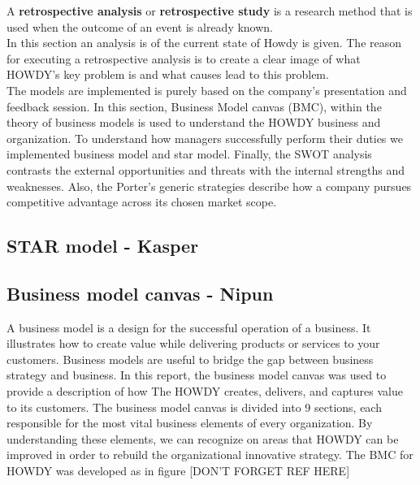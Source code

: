 

A \textbf{retrospective analysis} or \textbf{retrospective study} is a research method that is used when the outcome of an event is already known.\\
\noindent In this section an analysis is of the current state of Howdy is given. The reason for executing a retrospective analysis is to create a clear image of what HOWDY’s key problem is and what causes lead to this problem.\\
\noindent The models are implemented is purely based on the company’s presentation and feedback session. In this section, Business Model canvas (BMC), within the theory of business models is used to understand the HOWDY business and organization. To understand how managers successfully perform their duties we implemented business model and star model. Finally, the SWOT analysis contrasts the external opportunities and threats with the internal strengths and weaknesses. Also, the Porter's generic strategies describe how a company pursues competitive advantage across its chosen market scope.



\subsection{STAR model - Kasper}

\subsection{Business model canvas - Nipun}
A business model is a design for the successful operation of a business. It illustrates how to create value while delivering products or services to your customers. Business models are useful to bridge the gap between business strategy and business. In this report, the business model canvas was used to provide a description of how The HOWDY creates, delivers, and captures value to its customers. The business model canvas is divided into 9 sections, each responsible for the most vital business elements of every organization. By understanding these elements, we can recognize on areas that HOWDY can be improved in order to rebuild the organizational innovative strategy. The BMC for HOWDY was developed as in figure [DON'T FORGET REF HERE]\\

